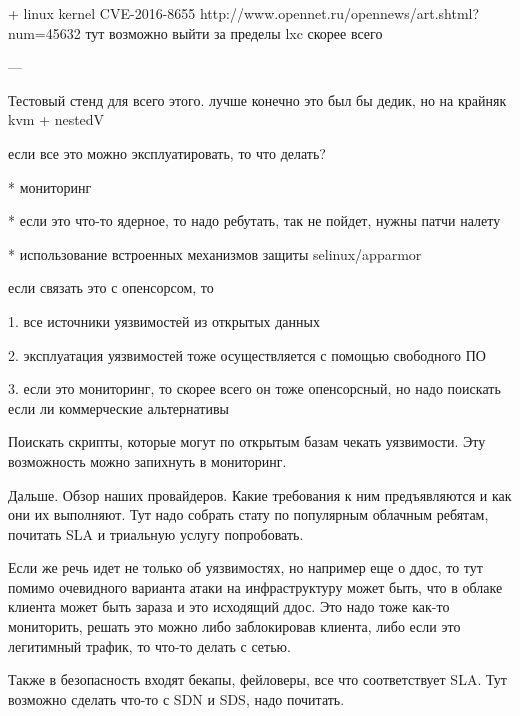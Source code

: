 + linux kernel CVE-2016-8655 http://www.opennet.ru/opennews/art.shtml?num=45632
тут возможно выйти за пределы lxc скорее всего

---

Тестовый стенд для всего этого.
лучше конечно это был бы дедик, но на крайняк kvm + nestedV

если все это можно эксплуатировать, то что делать?

* мониторинг

* если это что-то ядерное, то надо ребутать, так не пойдет, нужны патчи налету

* использование встроенных механизмов защиты selinux/apparmor

если связать это с опенсорсом, то

1. все источники уязвимостей из открытых данных

2. эксплуатация уязвимостей тоже осуществляется с помощью свободного ПО

3. если это мониторинг, то скорее всего он тоже опенсорсный, но надо поискать если ли коммерческие альтернативы

Поискать скрипты, которые могут по открытым базам чекать уязвимости.
Эту возможность можно запихнуть в мониторинг.


Дальше.
Обзор наших провайдеров.
Какие требования к ним предъявляются и как они их выполняют.
Тут надо собрать стату по популярным облачным ребятам, почитать SLA и триальную услугу попробовать.

Если же речь идет не только об уязвимостях, но например еще о ддос, то тут помимо очевидного варианта атаки на инфраструктуру может быть, что в облаке клиента может быть зараза и это исходящий ддос.
Это надо тоже как-то мониторить, решать это можно либо заблокировав клиента, либо если это легитимный трафик, то что-то делать с сетью.

Также в безопасность входят бекапы, фейловеры, все что соответствует SLA.
Тут возможно сделать что-то с SDN и SDS, надо почитать.

\clearpage

